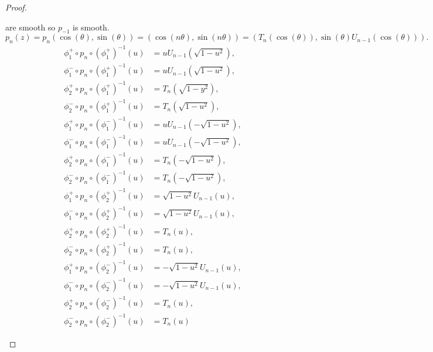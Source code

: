 \begin{proof}
\begin{enumerate}[itemsep=0pt,label={(\alph*)}]
              are smooth so \( p_{-1} \) is smooth.
              \[
                  p_{n}(z) = p_{n}(\cos(\theta), \sin(\theta)) = (\cos(n\theta), \sin(n\theta)) = (T_{n}(\cos(\theta)), \sin(\theta) U_{n-1}(\cos(\theta))).
              \]
              \begingroup
              \allowdisplaybreaks%
              \begin{align*}
                  \phi_{1}^{+} \circ p_{n} \circ {\left(\phi_{1}^{+}\right)}^{-1}(u) & = u U_{n-1}(\sqrt{1 - u^{2}}),  \\
                  \phi_{1}^{-} \circ p_{n} \circ {\left(\phi_{1}^{+}\right)}^{-1}(u) & = u U_{n-1}(\sqrt{1 - u^{2}}),  \\
                  \phi_{2}^{+} \circ p_{n} \circ {\left(\phi_{1}^{+}\right)}^{-1}(u) & = T_{n}(\sqrt{1 - y^{2}}),      \\
                  \phi_{2}^{-} \circ p_{n} \circ {\left(\phi_{1}^{+}\right)}^{-1}(u) & = T_{n}(\sqrt{1 - u^{2}}),      \\
                  \phi_{1}^{+} \circ p_{n} \circ {\left(\phi_{1}^{-}\right)}^{-1}(u) & = u U_{n-1}(-\sqrt{1 - u^{2}}), \\
                  \phi_{1}^{-} \circ p_{n} \circ {\left(\phi_{1}^{-}\right)}^{-1}(u) & = u U_{n-1}(-\sqrt{1 - u^{2}}), \\
                  \phi_{2}^{+} \circ p_{n} \circ {\left(\phi_{1}^{-}\right)}^{-1}(u) & = T_{n}(-\sqrt{1 - u^{2}}),     \\
                  \phi_{2}^{-} \circ p_{n} \circ {\left(\phi_{1}^{-}\right)}^{-1}(u) & = T_{n}(-\sqrt{1 - u^{2}}),     \\
                  \phi_{1}^{+} \circ p_{n} \circ {\left(\phi_{2}^{+}\right)}^{-1}(u) & = \sqrt{1 - u^{2}} U_{n-1}(u),  \\
                  \phi_{1}^{-} \circ p_{n} \circ {\left(\phi_{2}^{+}\right)}^{-1}(u) & = \sqrt{1 - u^{2}} U_{n-1}(u),  \\
                  \phi_{2}^{+} \circ p_{n} \circ {\left(\phi_{2}^{+}\right)}^{-1}(u) & = T_{n}(u),                     \\
                  \phi_{2}^{-} \circ p_{n} \circ {\left(\phi_{2}^{+}\right)}^{-1}(u) & = T_{n}(u),                     \\
                  \phi_{1}^{+} \circ p_{n} \circ {\left(\phi_{2}^{-}\right)}^{-1}(u) & = -\sqrt{1 - u^{2}}U_{n-1}(u),  \\
                  \phi_{1}^{-} \circ p_{n} \circ {\left(\phi_{2}^{-}\right)}^{-1}(u) & = -\sqrt{1 - u^{2}}U_{n-1}(u),  \\
                  \phi_{2}^{+} \circ p_{n} \circ {\left(\phi_{2}^{-}\right)}^{-1}(u) & = T_{n}(u),                     \\
                  \phi_{2}^{-} \circ p_{n} \circ {\left(\phi_{2}^{-}\right)}^{-1}(u) & = T_{n}(u)
              \end{align*}
              \endgroup


\end{enumerate}
\end{proof}
